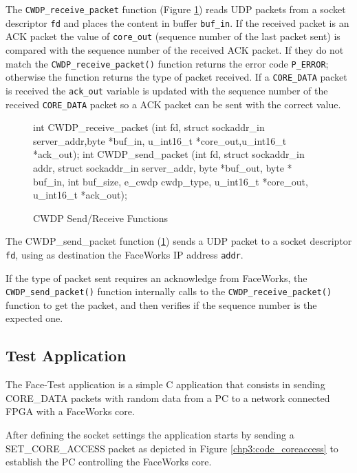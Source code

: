 \documentclass[defaultstyle,10pt,master,Helvetica]{thesis}
\begin{document}
The \texttt{CWDP\_receive\_packet} function (Figure \ref{fig:drivers}) reads \ac{UDP} packets from a socket descriptor {\tt fd} and places the content in buffer {\tt buf\_in}. If the received packet is an \ac{ACK} packet the value of {\tt core\_out} (sequence number of the last packet sent) is compared with the sequence number of the received ACK packet. If they do not match the {\tt CWDP\_receive\_packet()} function returns the error code {\tt P\_ERROR}; otherwise the function returns the type of packet received. If a {\tt CORE\_DATA} packet is received the {\tt ack\_out} variable is updated with the sequence number of the received {\tt CORE\_DATA} packet so a \ac{ACK} packet can be sent with the correct value.

\begin{figure}[h]
\begin{boxedverbatim}
int CWDP_receive_packet (int fd, struct sockaddr_in server_addr,byte *buf_in,
u_int16_t *core_out,u_int16_t *ack_out);
int CWDP_send_packet (int fd, struct sockaddr_in addr, struct sockaddr_in server_addr, byte *buf_out,
byte * buf_in, int buf_size, e_cwdp cwdp_type, u_int16_t *core_out, u_int16_t *ack_out);
\end{boxedverbatim}
\caption{\ac{CWDP} Send/Receive Functions}
\label{fig:drivers}
\end{figure}

The CWDP\_send\_packet function (\ref{fig:drivers}) sends a \ac{UDP} packet to a socket descriptor {\tt fd}, using as destination the FaceWorks IP address {\tt addr}.

If the type of packet sent requires an acknowledge from FaceWorks, the {\tt CWDP\_send\_packet()} function internally calls to the {\tt CWDP\_receive\_packet()} function to get the packet, and then verifies if the sequence number is the expected one. 



\subsection{Test Application}

The Face-Test application is a simple C application that consists in sending CORE\_DATA packets with random data from a PC to a network connected \ac{FPGA} with a FaceWorks core.

After defining the socket settings the application starts by sending a SET\_CORE\_ACCESS packet as depicted in Figure \ref{chp3:code_coreaccess} to establish the PC controlling the FaceWorks core.
\end{document}
